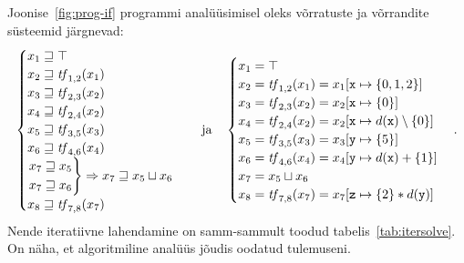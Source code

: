 \documentclass[../thesis.tex]{subfiles}
\begin{document}
Joonise~\ref{fig:prog-if} programmi analüüsimisel oleks võrratuste ja võrrandite süsteemid järgnevad:
\[
	\begin{cases}
		x_1 \sqgeq \top \\
		x_2 \sqgeq \tf_{1,2}(x_1) \\
		x_3 \sqgeq \tf_{2,3}(x_2) \\
		x_4 \sqgeq \tf_{2,4}(x_2) \\
		x_5 \sqgeq \tf_{3,5}(x_3) \\
		x_6 \sqgeq \tf_{4,6}(x_4) \\
		\begin{rcases*}
			x_7 \sqgeq x_5 \\
			x_7 \sqgeq x_6
		\end{rcases*} \Rightarrow x_7 \sqgeq x_5 \sqcup x_6 \\
		x_8 \sqgeq \tf_{7,8}(x_7)
	\end{cases}
	\quad \text{ja} \quad
	\begin{cases}
		x_1 = \top \\
		x_2 = \tf_{1,2}(x_1) = x_1[\texttt{x} \mapsto \{0, 1, 2\}] \\
		x_3 = \tf_{2,3}(x_2) = x_2[\texttt{x} \mapsto \{0\}] \\
		x_4 = \tf_{2,4}(x_2) = x_2[\texttt{x} \mapsto d(\texttt{x}) \setminus \{0\}] \\
		x_5 = \tf_{3,5}(x_3) = x_3[\texttt{y} \mapsto \{5\}] \\
		x_6 = \tf_{4,6}(x_4) = x_4[\texttt{y} \mapsto d(\texttt{x}) + \{1\}] \\
		x_7 = x_5 \sqcup x_6 \\
		x_8 = \tf_{7,8}(x_7) = x_7[\texttt{z} \mapsto \{2\} * d(\texttt{y})]
	\end{cases}.
\]
Nende iteratiivne lahendamine on samm-sammult toodud tabelis~\ref{tab:itersolve}. On näha, et algoritmiline analüüs jõudis oodatud tulemuseni.
\end{document}
